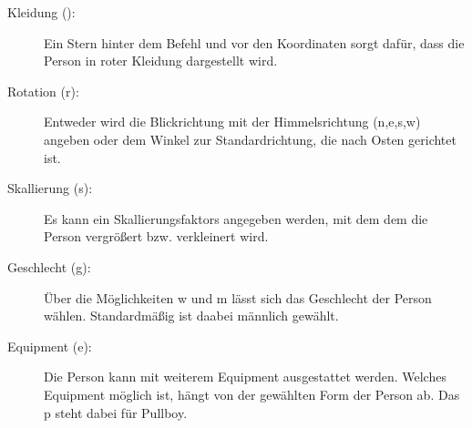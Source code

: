 \documentclass[
    a4paper,
    12pt,
    parskip=half,
]{scrartcl}
\begin{document}
\begin{description}
    \item[Kleidung (\textasteriskcentered):] Ein Stern hinter dem Befehl und vor den Koordinaten sorgt dafür, dass die Person in roter Kleidung dargestellt wird.
\begin{example}
\end{example}

    \item[Rotation (r):] Entweder wird die Blickrichtung mit der Himmelsrichtung (n,e,s,w) angeben oder dem Winkel zur Standardrichtung, die nach Osten gerichtet ist.
\begin{example}
\end{example}

    \item[Skallierung (s):] Es kann ein Skallierungsfaktors angegeben werden, mit dem dem die Person vergrößert bzw. verkleinert wird.
\begin{example}
\end{example}

    \item[Geschlecht (g):] Über die Möglichkeiten w und m lässt sich das Geschlecht der Person wählen. Standardmäßig ist daabei männlich gewählt.
\begin{example}
\end{example}

    \item[Equipment (e):] Die Person kann mit weiterem Equipment ausgestattet werden. Welches Equipment möglich ist, hängt von der gewählten Form der Person ab. Das p steht dabei für Pullboy.
\begin{example}
\end{example}

\end{description}
\end{document}
